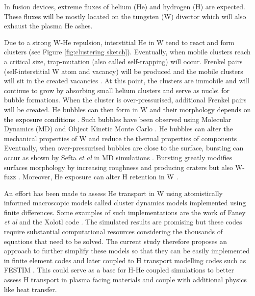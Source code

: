 In fusion devices, extreme fluxes of helium (He) and hydrogen (H) are expected.
These fluxes will be mostly located on the tungsten (W) divertor which will also exhaust the plasma He ashes.

Due to a strong W-He repulsion, interstitial He in W tend to \textcolor{black}{react and} form clusters  (see Figure \ref{fig:clustering sketch}).
Eventually, when mobile clusters reach a critical size, trap-mutation (also called self-trapping) will occur.
Frenkel pairs (self-interstitial W atom and vacancy) will be produced and the mobile clusters will sit in the created vacancies .
At this point, the clusters are immobile and will continue to grow by absorbing small helium clusters and serve as nuclei for bubble formations.
When the cluster is over-pressurised, additional Frenkel pairs will be created.
He bubbles can then form in W and \textcolor{black}{their morphology depends on the exposure conditions} .
Such bubbles have been observed using Molecular Dynamics (MD)   and Object Kinetic Monte Carlo .
He bubbles can alter the mechanical properties of W  and reduce the thermal properties of components .
Eventually, when over-pressurised bubbles are close to the surface, bursting can occur as shown by Sefta \textit{et al} in MD simulations .
Bursting greatly modifies surfaces morphology by increasing roughness and producing craters  but also W-fuzz .
Moreover, He exposure can alter H retention in W .

An effort has been made to assess He transport in W using atomistically informed macroscopic models called cluster dynamics models implemented using finite differences.
Some examples of such implementations are the work of Faney \textit{et al}  and the Xolotl code .
The simulated results are promising but these codes require substantial computational resources considering the thousands of equations that need to be solved.
The current study therefore proposes an approach to further simplify these models so that they can be easily implemented in finite element codes and later coupled to H transport modelling codes such as FESTIM .
This could serve as a base for H-He coupled simulations to better assess H transport in plasma facing materials and couple with additional physics like heat transfer.

